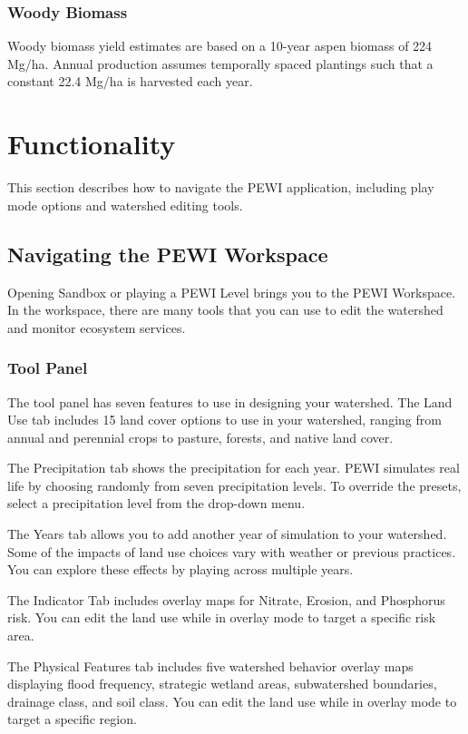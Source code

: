 \documentclass[11pt]{article}
\begin{document}
\begin{itemize}
\subsubsection{Woody Biomass}
Woody biomass yield estimates are based on a 10-year aspen biomass of 224 Mg/ha.\cite{46}  Annual production assumes temporally spaced plantings such that a constant 22.4 Mg/ha is harvested each year.

\newpage

\section{Functionality}
This section describes how to navigate the PEWI application, including play mode options and watershed editing tools.

\subsection{Navigating the PEWI Workspace}
Opening Sandbox or playing a PEWI Level brings you to the PEWI Workspace. In the workspace, there are many tools that you can use to edit the watershed and monitor ecosystem services.

\subsubsection{Tool Panel}
The tool panel has seven features to use in designing your watershed. The Land Use tab includes 15 land cover options to use in your watershed, ranging from annual and perennial crops to pasture, forests, and native land cover.

The Precipitation tab shows the precipitation for each year. PEWI simulates real life by choosing randomly from seven precipitation levels. To override the presets, select a precipitation level from the drop-down menu.

The Years tab allows you to add another year of simulation to your watershed. Some of the impacts of land use choices vary with weather or previous practices. You can explore these effects by playing across multiple years.

The Indicator Tab includes overlay maps for Nitrate, Erosion, and Phosphorus risk. You can edit the land use while in overlay mode to target a specific risk area.

The Physical Features tab includes five watershed behavior overlay maps displaying flood frequency, strategic wetland areas, subwatershed boundaries, drainage class, and soil class. You can edit the land use while in overlay mode to target a specific region.


\end{itemize}
\end{document}
